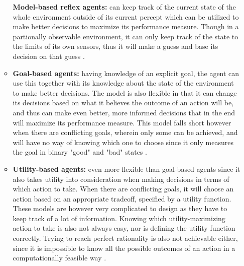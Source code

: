 \begin{enumerate}
\begin{itemize}
        \textbf{Model-based reflex agents:} can keep track of the current state
        of the whole environment outside of its current percept which can be 
        utilized to make better decisions to maximize its performance measure.
        Though in a partionally observable environment, it can only keep track 
        of the state to the limits of its own sensors, thus it will make a guess 
        and base its decision on that guess 
        \autocite[pp.~69--71]{russell2021artificial}.
    \item 
        \textbf{Goal-based agents:} having knowledge of an explicit goal, the 
        agent can use this together with its knowledge about the state of the 
        environment to make better decisions. The model is also flexible in that
        it can change its decisions based on what it believes the outcome of an
        action will be, and thus can make even better, more informed decisions 
        that in the end will maximize its performance measure. This model falls
        short however when there are conflicting goals, wherein only some can be
        achieved, and will have no way of knowing which one to choose since it
        only measures the goal in binary "good" and "bad" states 
        \autocite[pp.~71--72]{russell2021artificial}.
    \item 
        \textbf{Utility-based agents:} even more flexible than goal-based agents
        since it also takes utility into consideration when making decisions in 
        terms of which action to take. When there are conflicting goals, it will
        choose an action based on an appropriate tradeoff, specified by a
        utility function. These models are however very complicated to design as
        they have to keep track of a lot of information. Knowing which
        utility-maximizing action to take is also not always easy, nor is 
        defining the utility function correctly. Trying to reach perfect 
        rationality is also not achievable either, since it is impossible to
        know all the possible outcomes of an action in a computationally
        feasible way \autocite[pp.~72--74]{russell2021artificial}.
    \end{itemize}
\end{enumerate}

